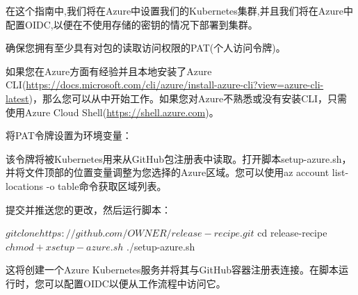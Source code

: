 
在这个指南中,我们将在Azure中设置我们的Kubernetes集群,并且我们将在Azure中配置OIDC,以便在不使用存储的密钥的情况下部署到集群。


确保您拥有至少具有对包的读取访问权限的PAT(个人访问令牌)。

如果您在Azure方面有经验并且本地安装了Azure CLI(\url{https://docs.microsoft.com/cli/azure/install-azure-cli?view=azure-cli-latest})，那么您可以从中开始工作。如果您对Azure不熟悉或没有安装CLI，只需使用Azure Cloud Shell(\url{https://shell.azure.com})。

将PAT令牌设置为环境变量：


该令牌将被Kubernetes用来从GitHub包注册表中读取。打开脚本setup-azure.sh，并将文件顶部的位置变量调整为您选择的Azure区域。您可以使用az account list-locations -o table命令获取区域列表。

提交并推送您的更改，然后运行脚本：

\begin{shell}
$ git clone https://github.com/{OWNER}/release-recipe.git
$ cd release-recipe
$ chmod +x setup-azure.sh
$ ./setup-azure.sh
\end{shell}

这将创建一个Azure Kubernetes服务并将其与GitHub容器注册表连接。在脚本运行时，您可以配置OIDC以便从工作流程中访问它。


